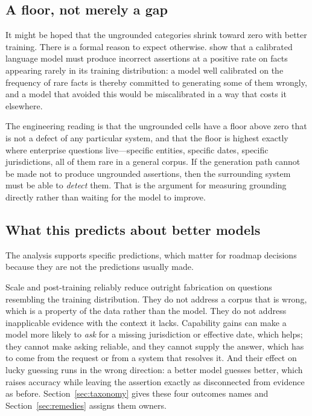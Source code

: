 \subsection{A floor, not merely a gap}
\label{sec:floor}

It might be hoped that the ungrounded categories shrink toward zero with better
training. There is a formal reason to expect otherwise.
\citet{kalai2024} show that a calibrated language model must produce incorrect
assertions at a positive rate on facts appearing rarely in its training
distribution: a model well calibrated on the frequency of rare facts is thereby
committed to generating some of them wrongly, and a model that avoided this would
be miscalibrated in a way that costs it elsewhere.

The engineering reading is that the ungrounded cells have a floor above zero that
is not a defect of any particular system, and that the floor is highest exactly
where enterprise questions live---specific entities, specific dates, specific
jurisdictions, all of them rare in a general corpus. If the generation path cannot
be made not to produce ungrounded assertions, then the surrounding system must be
able to \emph{detect} them. That is the argument for measuring grounding directly
rather than waiting for the model to improve.

\subsection{What this predicts about better models}
\label{sec:better-models}

The analysis supports specific predictions, which matter for roadmap decisions
because they are not the predictions usually made.

Scale and post-training reliably reduce outright fabrication on questions
resembling the training distribution. They do not address a corpus that is wrong,
which is a property of the data rather than the model. They do not address
inapplicable evidence with the context it lacks. Capability gains can make a model
more likely to \emph{ask} for a missing jurisdiction or effective date, which helps;
they cannot make asking reliable, and they cannot supply the answer, which has to come
from the request or from a system that resolves it. And their effect on lucky
guessing runs in the wrong direction: a better model guesses better, which raises
accuracy while leaving the assertion exactly as disconnected from evidence as
before. Section~\ref{sec:taxonomy} gives these four outcomes names and
Section~\ref{sec:remedies} assigns them owners.

